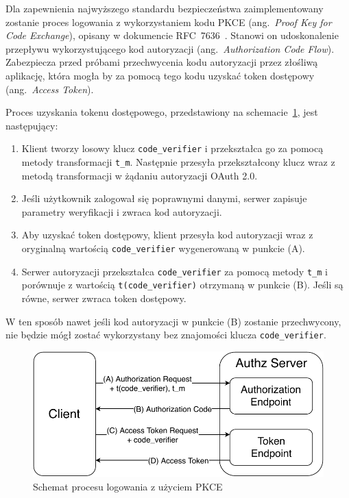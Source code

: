 	Dla zapewnienia najwyższego standardu bezpieczeństwa zaimplementowany zostanie proces logowania z wykorzystaniem kodu PKCE (ang.\ \emph{Proof Key for Code Exchange}),
	opisany w dokumencie RFC~7636~\cite{PKCE}.
	Stanowi on udoskonalenie przepływu wykorzystującego kod autoryzacji (ang.\ \emph{Authorization Code Flow}).
	Zabezpiecza przed próbami przechwycenia kodu autoryzacji przez złośliwą aplikację,
	która mogła by za pomocą tego kodu uzyskać token dostępowy (ang.\ \emph{Access Token}).
	
	Proces uzyskania tokenu dostępowego, przedstawiony na schemacie~\ref{fig:pkce}, jest następujący:
	\begin{enumerate}[label=\Alph*.]
		\item Klient tworzy losowy klucz \verb|code_verifier| i przekształca go za pomocą metody transformacji \verb|t_m|.
			Następnie przesyła przekształcony klucz wraz z metodą transformacji w żądaniu autoryzacji OAuth 2.0.
		\item Jeśli użytkownik zalogował się poprawnymi danymi, serwer zapisuje parametry weryfikacji i zwraca kod autoryzacji.
		\item Aby uzyskać token dostępowy, klient przesyła kod autoryzacji wraz z oryginalną wartością \verb|code_verifier| wygenerowaną w punkcie (A).
		\item Serwer autoryzacji przekształca \verb|code_verifier| za pomocą metody \verb|t_m|
			i porównuje z wartością \verb|t(code_verifier)| otrzymaną w punkcie (B).
			Jeśli są równe, serwer zwraca token dostępowy.
	\end{enumerate}

	W ten sposób nawet jeśli kod autoryzacji w punkcie (B) zostanie przechwycony,
	nie będzie mógł zostać wykorzystany bez znajomości klucza \verb|code_verifier|.

	\begin{figure}[ht]
		\centering
			\includegraphics[width=0.6\linewidth]{rys03/pkce.pdf}
		 \caption{Schemat procesu logowania z użyciem PKCE}
		 \label{fig:pkce}
	\end{figure}
